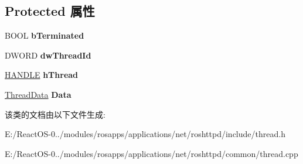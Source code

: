\subsection*{Protected 属性}
\begin{DoxyCompactItemize}
\item 
\mbox{\label{class_c_thread_ac1c59c9fefb4f347ef1cbfab1f82f698}} 
B\+O\+OL {\bfseries b\+Terminated}
\item 
\mbox{\label{class_c_thread_ad9344253f2102a9190780ab4b145b79a}} 
D\+W\+O\+RD {\bfseries dw\+Thread\+Id}
\item 
\mbox{\label{class_c_thread_a829e00b45c46d47bc2b93d7dbc523ee1}} 
\hyperlink{interfacevoid}{H\+A\+N\+D\+LE} {\bfseries h\+Thread}
\item 
\mbox{\label{class_c_thread_ab9ee9b21f241fec7de76caed53823f10}} 
\hyperlink{struct_thread_data}{Thread\+Data} {\bfseries Data}
\end{DoxyCompactItemize}


该类的文档由以下文件生成\+:\begin{DoxyCompactItemize}
\item 
E\+:/\+React\+O\+S-\/0../modules/rosapps/applications/net/roshttpd/include/thread.\+h\item 
E\+:/\+React\+O\+S-\/0../modules/rosapps/applications/net/roshttpd/common/thread.\+cpp\end{DoxyCompactItemize}
